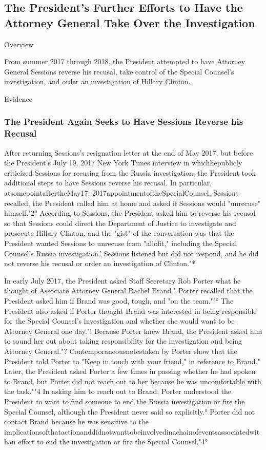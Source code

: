 \subsection{The President's Further Efforts to Have the Attorney General Take Over the Investigation}

Overview

From summer 2017 through 2018, the President attempted to have Attorney General Sessions reverse his recusal, take control of the Special Counsel's investigation, and order an investigation of Hillary Clinton.

Evidence

\subsubsection{The President Again Seeks to Have Sessions Reverse his Recusal}

After returning Sessions's resignation letter at the end of May 2017, but before the President's July 19, 2017 New York Times interview in whichhepublicly criticized Sessions for recusing from the Russia investigation, the President took additional steps to have Sessions reverse his recusal.
In particular, atsomepointaftertheMay17, 2017appointmentoftheSpecialCounsel, Sessions recalled, the President called him at home and asked if Sessions would "unrecuse" himself."2°
According to Sessions, the President asked him to reverse his recusal so that Sessions could direct the Department of Justice to investigate and prosecute Hillary Clinton, and the "gist" of the conversation was that the President wanted Sessions to unrecuse from "allofit," including the Special Counsel's Russia investigation.'
Sessions listened but did not respond, and he did not reverse his recusal or order an investigation of Clinton."*

In early July 2017, the President asked Staff Secretary Rob Porter what he thought of Associate Attorney General Rachel Brand."
Porter recalled that the President asked him if Brand was good, tough, and "on the team.""°
The President also asked if Porter thought Brand was interested in being responsible for the Special Counsel's investigation and whether she would want to be Attorney General one day."!
Because Porter knew Brand, the President asked him to sound her out about taking responsibility for the investigation and being Attorney General."?
Contemporaneousnotestaken by Porter show that the President told Porter to "Keep in touch with your friend," in reference to Brand."
Later, the President asked Porter a few times in passing whether he had spoken to Brand, but Porter did not reach out to her because he was uncomfortable with the task.""4
In asking him to reach out to Brand, Porter understood the President to want to find someone to end the Russia investigation or fire the Special Counsel, although the President never said so explicitly.°
Porter did not contact Brand because he was sensitive to the implicationsofthatactionanddidnotwanttobeinvolvedinachainofeventsassociatedwithan effort to end the investigation or fire the Special Counsel."4°

